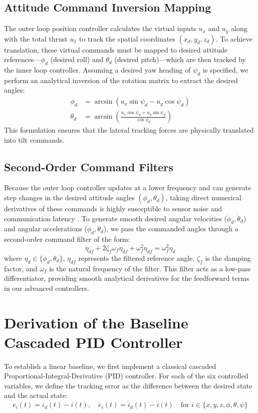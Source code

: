 \subsection{Attitude Command Inversion Mapping}
The outer loop position controller calculates the virtual inputs $u_x$ and $u_y$ along with the total thrust $u_1$ to track the spatial coordinates $(x_d, y_d, z_d)$. To achieve translation, these virtual commands must be mapped to desired attitude references—$\phi_d$ (desired roll) and $\theta_d$ (desired pitch)—which are then tracked by the inner loop controller. Assuming a desired yaw heading of $\psi_d$ is specified, we perform an analytical inversion of the rotation matrix to extract the desired angles:
\begin{align}
\phi_d &= \arcsin(u_x \sin\psi_d - u_y \cos\psi_d) \\
\theta_d &= \arcsin\left( \frac{u_x \cos\psi_d + u_y \sin\psi_d}{\cos\phi_d} \right)
\end{align}
This formulation ensures that the lateral tracking forces are physically translated into tilt commands.

\subsection{Second-Order Command Filters}
Because the outer loop controller updates at a lower frequency and can generate step changes in the desired attitude angles $(\phi_d, \theta_d)$, taking direct numerical derivatives of these commands is highly susceptible to sensor noise and communication latency \cite{ref_74}. To generate smooth desired angular velocities ($\dot{\phi}_d, \dot{\theta}_d$) and angular accelerations ($\ddot{\phi}_d, \ddot{\theta}_d$), we pass the commanded angles through a second-order command filter of the form:
\begin{equation}
\ddot{\eta}_{df} + 2\zeta_f \omega_f \dot{\eta}_{df} + \omega_f^2 \eta_{df} = \omega_f^2 \eta_d
\end{equation}
where $\eta_d \in \{\phi_d, \theta_d\}$, $\eta_{df}$ represents the filtered reference angle, $\zeta_f$ is the damping factor, and $\omega_f$ is the natural frequency of the filter. This filter acts as a low-pass differentiator, providing smooth analytical derivatives for the feedforward terms in our advanced controllers.

\section{Derivation of the Baseline Cascaded PID Controller}
To establish a linear baseline, we first implement a classical cascaded Proportional-Integral-Derivative (PID) controller. For each of the six controlled variables, we define the tracking error as the difference between the desired state and the actual state:
\begin{equation}
e_i(t) = i_d(t) - i(t), \quad \dot{e}_i(t) = \dot{i}_d(t) - \dot{i}(t) \quad \text{for } i \in \{x, y, z, \phi, \theta, \psi\}
\end{equation}

